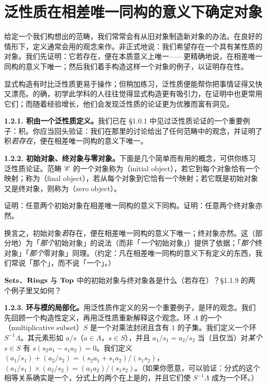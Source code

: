 \section{泛性质在相差唯一同构的意义下确定对象}

给定一个我们构想出的范畴，我们常常会有从旧对象制造新对象的办法。在良好的情形下，定义通常会用\trUniversalProperty{}的观念来作。非正式地说：我们希望存在一个具有某性质的对象。我们先证明：它若存在，便在本质意义上唯一——更精确地说，在相差唯一同构的意义下唯一；然后我们着手构造这样一个对象的例子，以证明存在性。

显式构造有时比泛性质更易于操作；但稍加练习，泛性质便能帮你把事情证得又快又漂亮。的确，初学此学科的人往往觉得显式构造更有吸引力，在证明中也更常用它们；而随着经验增长，他们会发现泛性质的论证更为优雅而富有洞见。

\textbf{1.2.1. 积由一个泛性质定义。}\quad 我们已在 \S1.0.1 中见过泛性质论证的一个重要例子：积。你应当回头验证：我们在那里的讨论给出了任何范畴中\trProduct{}的观念，并证明了积\emph{若存在}，便在相差唯一同构的意义下唯一。

\textbf{1.2.2. 初始对象、终对象与零对象。}\quad 下面是几个简单而有用的概念，可供你练习泛性质论证。范畴 $\mathscr{C}$ 的一个对象称为\textbf{\trInitialObject}（initial object），若它到每个对象恰有一个映射；称为\textbf{\trFinalObject}（final object），若从每个对象到它恰有一个映射；若它既是初始对象又是终对象，则称为\textbf{\trZeroObject}（zero object）。

\begin{exercise}\label{ex:initial-final-objects-unique}
证明：任意两个初始对象在相差唯一同构的意义下同构。证明：任意两个终对象亦然。
\end{exercise}

换言之，初始对象\emph{若}存在，便在相差唯一同构的意义下唯一；终对象亦然。这（部分地）为「\emph{那个}初始对象」的说法（而非「\emph{一个}初始对象」）提供了依据；「\emph{那个}终对象」「\emph{那个}零对象」同理。（约定：凡在相差唯一同构的意义下有定义的东西，我们常说「那个」，而不说「一个」。）

\begin{exercise}\label{ex:initial-final-common-categories}
$\mathbf{Sets}$、$\mathbf{Rings}$ 与 $\mathbf{Top}$ 中的初始对象与终对象各是什么（若存在）？\S1.1.9 的两个例子里又如何？
\end{exercise}

\textbf{1.2.3. 环与模的局部化。}\quad 用泛性质作定义的另一个重要例子，是环的\trLocalization{}观念。我们先回顾一个构造性定义，再用泛性质重新解释这个观念。环 $\Lambda$ 的一个\textbf{\trMultiplicativeSubset}（multiplicative subset）$S$ 是一个对乘法封闭且含有 $1$ 的子集。我们定义一个环 $S^{-1}\Lambda$。其元素形如 $a/s$（$a\in\Lambda$，$s\in S$），并且 $a_1/s_1=a_2/s_2$ 当（且仅当）对\emph{某个} $s\in S$ 有 $s(s_2a_1-s_1a_2)=0$。我们定义 $(a_1/s_1)+(a_2/s_2)=(s_2a_1+s_1a_2)/(s_1s_2)$，$(a_1/s_1)\times(a_2/s_2)=(a_1a_2)/(s_1s_2)$。（如果你愿意，可以验证：分式的这个相等关系确实是一个\trEquivalenceRelation，分式上的两个\trBinaryOperation{}在\trEquivalenceClass{}上是\trWellDefined{}的，并且它们使 $S^{-1}\Lambda$ 成为一个环。）

